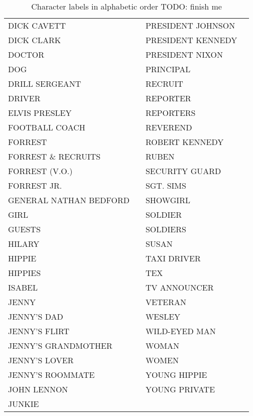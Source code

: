 \begin{table}
\begin{tabular}{p{4cm}p{4cm}p{4cm}p{4cm}}
 DICK CAVETT & &                              PRESIDENT JOHNSON & \\
 DICK CLARK & &                               PRESIDENT KENNEDY & \\
 DOCTOR & &                                   PRESIDENT NIXON & \\
 DOG & &                                      PRINCIPAL & \\
 DRILL SERGEANT & &                           RECRUIT & \\
 DRIVER & &                                   REPORTER & \\
 ELVIS PRESLEY & &                            REPORTERS & \\
 FOOTBALL COACH & &                            REVEREND & \\
 FORREST & &                                  ROBERT KENNEDY & \\
 FORREST \& RECRUITS & &                      RUBEN & \\
 FORREST (V.O.) & &                           SECURITY GUARD & \\
 FORREST JR. & &                              SGT. SIMS & \\
 GENERAL NATHAN BEDFORD & &                   SHOWGIRL & \\
 GIRL & &                                     SOLDIER & \\
 GUESTS & &                                   SOLDIERS & \\
 HILARY & &                                   SUSAN & \\
 HIPPIE & &                                   TAXI DRIVER & \\
 HIPPIES & &                                  TEX & \\
 ISABEL & &                                   TV ANNOUNCER & \\
 JENNY & &                                    VETERAN & \\
 JENNY'S DAD & &                              WESLEY & \\
 JENNY'S FLIRT & &                            WILD-EYED MAN & \\
 JENNY'S GRANDMOTHER & &                      WOMAN & \\
 JENNY'S LOVER & &                            WOMEN & \\
 JENNY'S ROOMMATE & &                         YOUNG HIPPIE & \\
 JOHN LENNON & &                              YOUNG PRIVATE & \\
 JUNKIE & & & \\



  \end{tabular}
  \caption{Character labels in alphabetic order TODO: finish me}
  \label{tab:characters}
\end{table}

